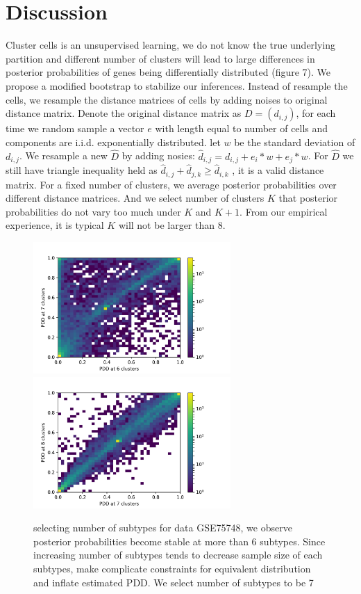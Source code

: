 \documentclass[11pt]{amsart}
\begin{document}
\section{Discussion}
Cluster cells is an unsupervised learning, we do not know the true underlying partition and different number of clusters will lead to large differences in posterior probabilities of genes being differentially distributed (figure 7). We propose a modified bootstrap to stabilize our inferences. Instead of resample the cells, we resample the distance matrices of cells by adding noises to original distance matrix. Denote the original distance matrix as $D = (d_{i,j})$, for each time we random sample a vector $e$ with length equal to number of cells and components are i.i.d. exponentially distributed. let $w$ be the standard deviation of $d_{i,j}$. We resample a new $\hat{D}$ by adding nosies: $\hat{d}_{i,j} = d_{i,j} + e_i * w + e_j *w$. For $\hat{D}$ we still have triangle inequality held as $\hat{d}_{i,j} + \hat{d}_{j,k} \geq \hat{d}_{i,k}$ , it is a valid distance matrix. For a fixed number of clusters, we average posterior probabilities over different distance matrices. And we select number of clusters $K$ that posterior probabilities do not vary too much under $K$ and $K+1$. From our empirical experience, it is typical $K$ will not be larger than 8.\\
\begin{figure}[H]
  \includegraphics[height = 5cm, width=\linewidth]{DN_67.png}
\endminipage\hfill
{}
  \includegraphics[height = 5cm, width=\linewidth]{DN_78.png}
\endminipage\hfill
\caption{selecting number of subtypes for data GSE75748, we observe posterior probabilities become stable at more than 6 subtypes. Since increasing number of subtypes tends to decrease sample size of each subtypes, make complicate constraints for equivalent distribution and inflate estimated PDD.  We select number of subtypes to be 7}
\end{figure}
\end{document}
